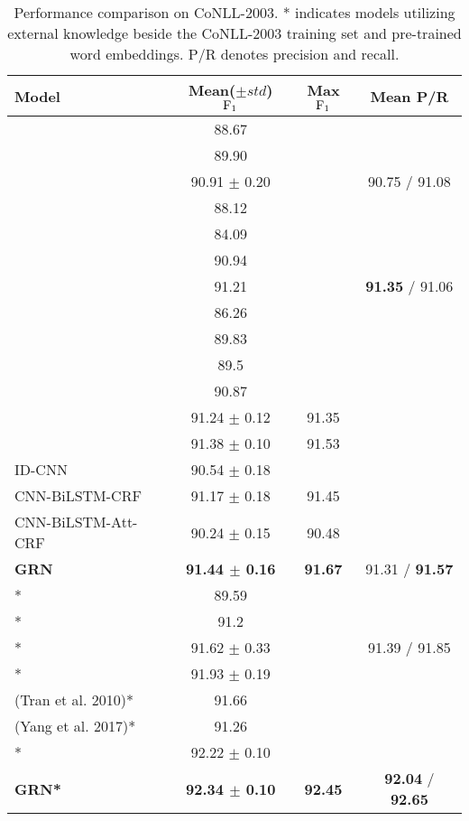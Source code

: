 \documentclass[letterpaper]{article} \usepackage{aaai19}  \usepackage{times}  \usepackage{helvet}  \usepackage{courier}  \usepackage{url}  \usepackage{graphicx}  \usepackage{amsmath}
\newcommand{\GRN}{GRN}
\begin{document}
\begin{table}[t!]
  \centering
    \begin{adjustbox}{max width=\columnwidth}
    \begin{tabular}{|l|c|c|c|}
      \hline
       Model & Mean($\pm std$) $\rm{F_1}$ &Max $\rm{F_1}$ & Mean P/R \\ \hline
       \cite{collobert2011natural} & 88.67 & &\\ \hline
       \cite{luo2015joint} & 89.90 & &\\ \hline
       \cite{chiu2016named} & 90.91 $\pm$ 0.20 & &90.75 / 91.08 \\ \hline
       \cite{zhuo2016segment} & 88.12  & &\\ \hline
       \cite{rei2016attending} &84.09 & &\\ \hline
       \cite{lample2016neural} & 90.94 & &\\ \hline
       \cite{ma2016CNNBLSTMCRF} & 91.21 & &\textbf{91.35} / 91.06 \\ \hline
       \cite{rei2017semi} & 86.26 & &\\ \hline
       \cite{zukov2017neural} &89.83 & &\\ \hline
       \cite{liu2017capturing} &89.5 &  &\\ \hline
       \cite{peters2017semi} & 90.87 & &\\ \hline
       \cite{Liu2018Empower} & 91.24 $\pm$ 0.12 &91.35 &\\ \hline
       \cite{Ye2018HSCRF} &91.38 $\pm$ 0.10 &91.53 &\\ \hline
       ID-CNN~\cite{strubell2017fast} &90.54 $\pm$ 0.18 & &\\ \hline
       CNN-BiLSTM-CRF & 91.17 $\pm$ 0.18 &91.45 &\\ \hline
       CNN-BiLSTM-Att-CRF &90.24 $\pm$ 0.15 &90.48 &\\ \hline
       \textbf{\GRN{}} & \textbf{ 91.44 $\pm$ 0.16} &\textbf{91.67} & 91.31 / \textbf{91.57}\\ \hline
       \hline
       \cite{collobert2011natural}* & 89.59 & &\\ \hline
       \cite{luo2015joint}* & 91.2 &  &\\ \hline
       \cite{chiu2016named}* & 91.62 $\pm$ 0.33 & & 91.39 / 91.85 \\ \hline
       \cite{peters2017semi}* & 91.93 $\pm$ 0.19  & &\\ \hline
       (Tran et al. 2010)* & 91.66  & &\\ \hline
       (Yang et al. 2017)* & 91.26 &  &\\ \hline
       \cite{peters2018deep}* & 92.22 $\pm$ 0.10 & &\\ \hline
       \textbf{\GRN{}*} & \textbf{92.34 $\pm$ 0.10} &\textbf{92.45} &\textbf{92.04} / \textbf{92.65}\\ \hline
    \end{tabular}
    \end{adjustbox}
    \caption{Performance comparison on CoNLL-2003. * indicates models utilizing external knowledge beside the CoNLL-2003 training set and pre-trained word embeddings. P/R denotes precision and recall.}
    \label{tab:compare_conll}
\end{table}
\end{document}
